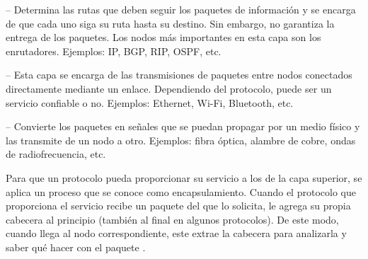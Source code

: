  -- Determina las rutas que deben seguir los paquetes de
información y se encarga de que cada uno siga su ruta hasta su destino. Sin
embargo, no garantiza la entrega de los paquetes. Los nodos más importantes en
esta capa son los enrutadores. Ejemplos: IP, BGP, RIP, OSPF, etc.

 -- Esta capa se encarga de las transmisiones de
paquetes entre nodos conectados directamente mediante un enlace. Dependiendo
del protocolo, puede ser un servicio confiable o no. Ejemplos: Ethernet, Wi-Fi,
Bluetooth, etc.

 -- Convierte los paquetes en señales que se puedan
propagar por un medio físico y las transmite de un nodo a otro. Ejemplos: fibra
óptica, alambre de cobre, ondas de radiofrecuencia, etc.

Para que un protocolo pueda proporcionar su servicio a los de la capa superior,
se aplica un proceso que se conoce como encapsulamiento. Cuando el protocolo
que proporciona el servicio recibe un paquete del que lo solicita, le agrega su
propia cabecera al principio (también al final en algunos protocolos). De este
modo, cuando llega al nodo correspondiente, este extrae la cabecera para
analizarla y saber qué hacer con el paquete \cite{Kurose2013}.
